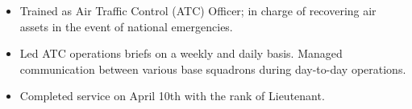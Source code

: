 \begin{itemize}
\item Trained as Air Traffic Control (ATC) Officer; in charge of recovering air assets in the event of national emergencies.
\item Led ATC operations briefs on a weekly and daily basis. Managed communication between various base squadrons during day-to-day operations.
\item Completed service on April 10th with the rank of Lieutenant.
\end{itemize}